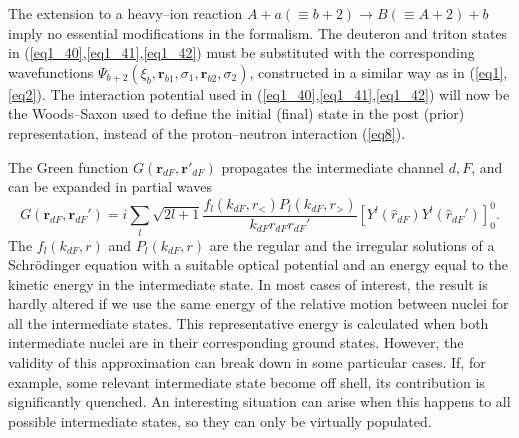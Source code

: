 \documentclass[a4paper,14pt]{book}
\begin{document}
The extension to a heavy--ion reaction $A+a(\equiv b+2) \longrightarrow B(\equiv A+2)+b$ imply no essential modifications in the formalism. The deuteron and triton states in (\ref{eq1_40},\ref{eq1_41},\ref{eq1_42}) must be substituted with the corresponding wavefunctions $\Psi_{b+2}(\xi_b,\mathbf r_{b1},\sigma_1,\mathbf r_{b2},\sigma_2)$, constructed in a similar way as in (\ref{eq1},\ref{eq2}). The interaction potential used in (\ref{eq1_40},\ref{eq1_41},\ref{eq1_42})  will now be the Woods--Saxon used to define the initial (final) state in the post (prior) representation, instead of the proton--neutron interaction (\ref{eq8}).

The Green function $G(\mathbf{r}_{dF},\mathbf{r}'_{dF})$ propagates the intermediate channel $d,F$, and can be expanded in partial waves
\begin{equation}\label{eq7}
G(\mathbf{r}_{dF},\mathbf{r}_{dF}')=i\sum_{l}\sqrt{2l+1}
\frac{f_{l}(k_{dF},r_<)P_{l}(k_{dF},r_>)}{k_{dF}r_{dF}r_{dF}'}
\left[  Y^{l} (\hat r_{dF}) Y^{l} (\hat r_{dF}')\right]_0^0.
\end{equation}
The $f_{l}(k_{dF},r)$ and $P_l(k_{dF},r)$ are the regular and the irregular solutions of a Schr\"{o}dinger equation with  a suitable optical potential and an energy equal to the kinetic energy in the intermediate state. In most cases of interest, the result is hardly altered if we use the same energy of the relative motion between nuclei for all the intermediate states. This representative energy is calculated when both intermediate nuclei are in their corresponding ground states. However, the validity of this approximation can break down in some particular cases. If, for example, some relevant intermediate state become off shell, its contribution is significantly quenched. An interesting situation can arise when this happens to all possible intermediate states, so they can only be virtually populated.  



\end{document}
